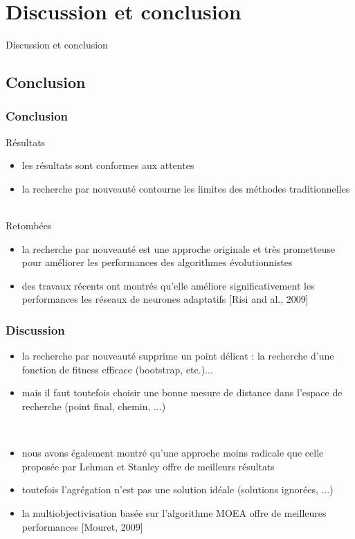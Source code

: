 \documentclass{beamer}
\begin{document}

\section{Discussion et conclusion}
\begin{frame}
\begin{center}
{\LARGE Discussion et conclusion}
\end{center}
\end{frame}


\subsection{Conclusion}

\begin{frame}
\frametitle{Conclusion}
Résultats
\begin{itemize}
    \item les résultats sont conformes aux attentes
    \item la recherche par nouveauté contourne les limites des méthodes traditionnelles
\end{itemize}
~\\
Retombées
\begin{itemize}
    \item la recherche par nouveauté est une approche originale et très prometteuse pour améliorer les performances des algorithmes évolutionnistes
    \item des travaux récents ont montrés qu'elle améliore significativement les performances les réseaux de neurones adaptatifs [Risi and al., 2009]
\end{itemize}
\end{frame}


\begin{frame}
\frametitle{Discussion}
\begin{itemize}
    \item la recherche par nouveauté supprime un point délicat : la recherche d'une fonction de fitness efficace (bootstrap, etc.)...
    \item mais il faut toutefois choisir une bonne mesure de distance dans l'espace de recherche (point final, chemin, ...)
\end{itemize}
~\\
\begin{itemize}
    \item nous avons également montré qu'une approche moins radicale que celle proposée par Lehman et Stanley offre de meilleurs résultats
    \item toutefois l'agrégation n'est pas une solution idéale (solutions ignorées, ...)
    \item la multiobjectivisation basée sur l'algorithme MOEA offre de meilleures performances [Mouret, 2009]
\end{itemize}
\end{frame}
\end{document}
